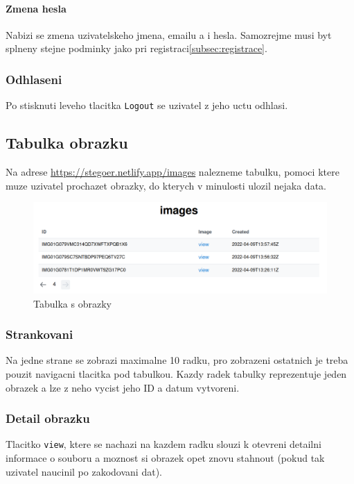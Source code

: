 \paragraph{Zmena hesla}

Nabizi se zmena uzivatelskeho jmena, emailu a i hesla.
Samozrejme musi byt splneny stejne podminky jako pri registraci\ref{subsec:registrace}.

\subsubsection{Odhlaseni}

Po stisknuti leveho tlacitka \texttt{Logout} se uzivatel z jeho uctu odhlasi.

\subsection{Tabulka obrazku}\label{subsec:tabulka-obrazku}
Na adrese \url{https://stegoer.netlify.app/images} nalezneme tabulku, pomoci
ktere muze uzivatel prochazet obrazky, do kterych v minulosti ulozil nejaka
data.

\begin{figure}
    \centering
    \includegraphics[scale=0.5]{assets/images/images-table}
    \caption{Tabulka s obrazky}\label{fig:tabulka-obrazky}
\end{figure}

\subsubsection{Strankovani}\label{subsubsec:strankovani}
Na jedne strane se zobrazi maximalne 10 radku, pro zobrazeni ostatnich je treba
pouzit navigacni tlacitka pod tabulkou.
Kazdy radek tabulky reprezentuje jeden obrazek a lze z neho vycist jeho ID a
datum vytvoreni.

\subsubsection{Detail obrazku}\label{subsubsec:detail-obrazku}
Tlacitko \texttt{view}, ktere se nachazi na kazdem radku slouzi k otevreni
detailni informace o souboru a moznost si obrazek opet znovu stahnout
(pokud tak uzivatel naucinil po zakodovani dat).

